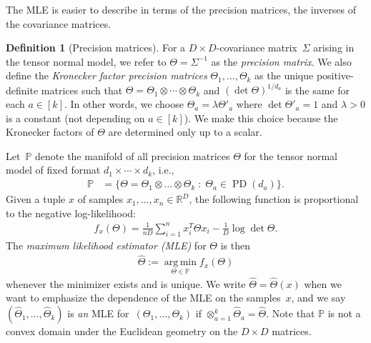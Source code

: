 \documentclass[aos]{imsart}
\theoremstyle{definition}
\newtheorem{definition}[theorem]{Definition}
\numberwithin{equation}{section}
\DeclareMathOperator{\PD}{PD}
\DeclareMathOperator*{\argmin}{arg\,min}
\newcommand{\R}{{\mathbb{R}}}
\renewcommand{\P}{{\mathbb{P}}}
\newcommand{\htheta}{\widehat{\Theta}}
\newcommand{\ot}{\otimes}
\newcommand{\samp}{x}
\newcommand{\ef}{f}
\newcommand{\MW}[1]{{\color{red}[MW: #1]}}
\newcommand{\MW}[1]{{}}
\begin{document}
The MLE is easier to describe in terms of the precision matrices, the inverses of the covariance matrices.

\begin{definition}[Precision matrices]
For a $D\times D$-covariance matrix~$\Sigma$ arising in the tensor normal model, we refer to $\Theta = \Sigma^{-1}$ as the \emph{precision matrix}.
We also define the \emph{Kronecker factor precision matrices} $\Theta_1, \dots, \Theta_k$ as the unique positive-definite matrices such that $\Theta = \Theta_1 \ot \cdots \ot \Theta_k$ and $(\det \Theta)^{1/d_a}$ is the same for each $a \in [k]$.
In other words, we choose $\Theta_a = \lambda \Theta'_a$ where $\det \Theta'_a = 1$ and $\lambda>0$ is a constant (not depending on $a\in [k]$). We make this choice because the Kronecker factors of $\Theta$ are determined only up to a scalar.
\end{definition}

Let~$\P$ denote the manifold of all precision matrices $\Theta$ for the tensor normal model of fixed format $d_1 \times \cdots \times d_k$, i.e.,
\begin{align*}
  \P &= \bigl\{ \Theta = \Theta_1 \ot \dots \ot \Theta_k \;:\; \Theta_a \in \PD(d_a) \bigr\}.
\end{align*}
Given a tuple $x$ of samples $\samp_1,\dots,\samp_n\in\R^D$, the following function is proportional to the negative log-likelihood: %
\begin{align}\label{eq:neg log likelihood}
  \ef_\samp(\Theta)
=  \frac{1}{nD}\sum_{i = 1}^n \samp_i^T \Theta \samp_i -  \frac{1}{D}\log\det\Theta.
\end{align}
The \emph{maximum likelihood estimator (MLE)} for $\Theta$ is then
\begin{align}\label{eq:mle}
  \widehat{\Theta} := \underset{\Theta \in \P}{ \argmin} f_x(\Theta)
\end{align}
whenever the minimizer exists and is unique.
We write $\widehat\Theta = \widehat\Theta(x)$ when we want to emphasize the dependence of the MLE on the samples~$x$, and we say $(\htheta_1, \dots, \htheta_k)$ is \emph{an} MLE for~$(\Theta_1, \dots, \Theta_k)$ if $\otimes_{a = 1}^k \htheta_a = \htheta$.
Note that $\P$ is not a convex domain under the Euclidean geometry on the $D\times D$ matrices.
\end{document}
